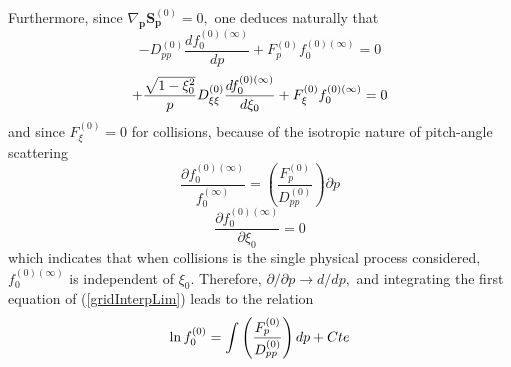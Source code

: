 Furthermore, since $\nabla _{\mathbf{p}}\mathbf{S}_{\mathbf{p}}^{\left(
0\right) }=0,$ one deduces naturally that
\begin{equation}
-D_{pp}^{\left( 0\right) }\frac{df_{0}^{\left( 0\right) (\infty )}}{dp}
+F_{p}^{\left( 0\right) }f_{0}^{\left( 0\right) (\infty )}=0
\end{equation}
\begin{equation}
+\frac{\sqrt{1-\xi _{0}^{2}}}{p}D_{\xi \xi }^{\left( 0\right) }\frac{%
df_{0}^{\left( 0\right) (\infty )}}{d\xi _{0}}+F_{\xi }^{\left( 0\right)
}f_{0}^{\left( 0\right) (\infty )}=0
\end{equation}
and since $F_{\xi }^{\left( 0\right) }=0$ for collisions, because of the
isotropic nature of pitch-angle scattering
\begin{equation}
\frac{\partial f_{0}^{\left( 0\right) (\infty )}}{f_{0}^{(\infty )}}=\left(
\frac{F_{p}^{\left( 0\right) }}{D_{pp}^{\left( 0\right) }}\right) \partial p
\label{gridInterpLim}
\end{equation}
\begin{equation}
\frac{\partial f_{0}^{\left( 0\right) (\infty )}}{\partial \xi _{0}}=0
\end{equation}
which indicates that when collisions is the single physical process
considered, $f_{0}^{\left( 0\right) (\infty )}$ is independent of $\xi _{0}.$
Therefore, $\partial /\partial p\rightarrow d/dp,$ and integrating the first
equation of (\ref{gridInterpLim}) leads to the relation
\begin{equation}
\ln f_{0}^{\left( 0\right) }=\int \left( \frac{F_{p}^{\left( 0\right) }}{%
D_{pp}^{\left( 0\right) }}\right) dp+Cte
\end{equation}

